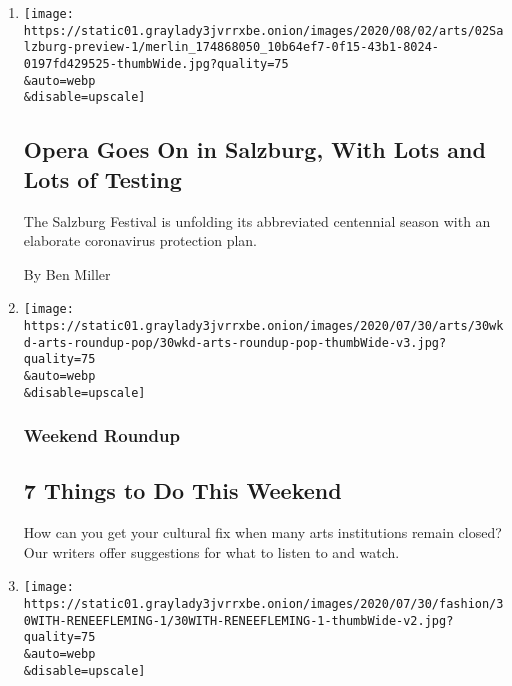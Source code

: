 \begin{enumerate}
\def\labelenumi{\arabic{enumi}.}
\item
  \href{/2020/07/31/arts/music/salzburg-festival-coronavirus-cosi.html}{}

  \texttt{[image: https://static01.graylady3jvrrxbe.onion/images/2020/08/02/arts/02Salzburg-preview-1/merlin\_174868050\_10b64ef7-0f15-43b1-8024-0197fd429525-thumbWide.jpg?quality=75\\\&auto=webp\\\&disable=upscale]}

  \hypertarget{opera-goes-on-in-salzburg-with-lots-and-lots-of-testing}{%
  \subsection{Opera Goes On in Salzburg, With Lots and Lots of
  Testing}\label{opera-goes-on-in-salzburg-with-lots-and-lots-of-testing}}

  The Salzburg Festival is unfolding its abbreviated centennial season
  with an elaborate coronavirus protection plan.

  By Ben Miller
\item
  \href{/2020/07/30/arts/things-to-do-weekend-coronavirus.html}{}

  \texttt{[image: https://static01.graylady3jvrrxbe.onion/images/2020/07/30/arts/30wkd-arts-roundup-pop/30wkd-arts-roundup-pop-thumbWide-v3.jpg?quality=75\\\&auto=webp\\\&disable=upscale]}

  \hypertarget{weekend-roundup}{%
  \subsubsection{Weekend Roundup}\label{weekend-roundup}}

  \hypertarget{7-things-to-do-this-weekend}{%
  \subsection{7 Things to Do This
  Weekend}\label{7-things-to-do-this-weekend}}

  How can you get your cultural fix when many arts institutions remain
  closed? Our writers offer suggestions for what to listen to and watch.
\item
  \href{/2020/07/30/style/maureen-dowd-renee-fleming.html}{}

  \texttt{[image: https://static01.graylady3jvrrxbe.onion/images/2020/07/30/fashion/30WITH-RENEEFLEMING-1/30WITH-RENEEFLEMING-1-thumbWide-v2.jpg?quality=75\\\&auto=webp\\\&disable=upscale]}


\end{enumerate}
